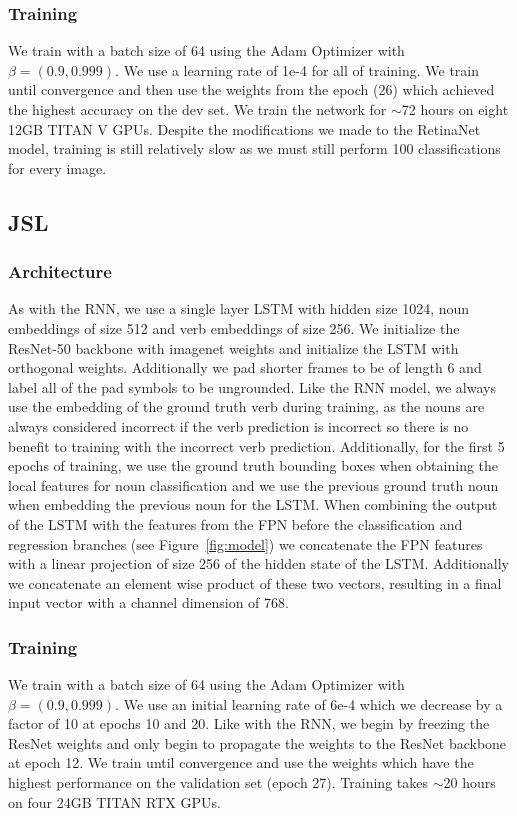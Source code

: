 \documentclass[runningheads]{llncs}
\begin{document}
\subsubsection{Training}
We train with a batch size of 64 using the Adam Optimizer \cite{KingmaAndBa2015} with $\beta=(0.9, 0.999)$. We use a learning rate of 1e-4 for all of training. We train until convergence and then use the weights from the epoch (26) which achieved the highest accuracy on the dev set. We train the network for $\sim$72 hours on eight 12GB TITAN V GPUs. Despite the modifications we made to the RetinaNet model, training is still relatively slow as we must still perform 100 classifications for every image. 


\subsection{JSL}
\subsubsection{Architecture}
As with the RNN, we use a single layer LSTM with hidden size 1024, noun embeddings of size 512 and verb embeddings of size 256. We initialize the ResNet-50 backbone with imagenet weights and initialize the LSTM with orthogonal weights. Additionally we pad shorter frames to be of length 6 and label all of the pad symbols to be ungrounded. Like the RNN model, we always use the embedding of the ground truth verb during training, as the nouns are always considered incorrect if the verb prediction is incorrect so there is no benefit to training with the incorrect verb prediction. Additionally, for the first 5 epochs of training, we use the ground truth bounding boxes when obtaining the local features for noun classification and we use the previous ground truth noun when embedding the previous noun for the LSTM. When combining the output of the LSTM with the features from the FPN before the classification and regression branches (see Figure~\ref{fig:model}) we concatenate the FPN features with a linear projection of size 256 of the hidden state of the LSTM. Additionally we concatenate an element wise product of these two vectors, resulting in a final input vector with a channel dimension of 768.  

\subsubsection{Training}
We train with a batch size of 64 using the Adam Optimizer \cite{KingmaAndBa2015} with $\beta=(0.9, 0.999)$. We use an initial learning rate of 6e-4 which we decrease by a factor of 10 at epochs 10 and 20. Like with the RNN, we begin by freezing the ResNet weights and only begin to propagate the weights to the ResNet backbone at epoch 12. We train until convergence and use the weights which have the highest performance on the validation set (epoch 27). Training takes $\sim$20 hours on four 24GB TITAN RTX GPUs. 
\end{document}
